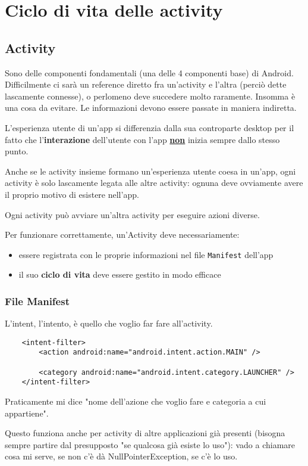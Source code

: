 
\chapter{Ciclo di vita delle activity}
\section{Activity}
\par Sono delle componenti fondamentali (una delle 4 componenti base) di Android. Difficilmente ci sarà un reference diretto fra un'activity e l'altra (perciò dette lascamente connesse), o perlomeno deve succedere molto raramente. Insomma è una cosa da evitare. Le informazioni devono essere passate in maniera indiretta.
\par L'esperienza utente di un'app si differenzia dalla sua controparte desktop per il fatto che l'\textbf{interazione} dell'utente con l'app \textbf{\underline{non}} inizia sempre dallo stesso punto.
\par Anche se le activity insieme formano un'esperienza utente coesa in un'app, ogni activity è solo lascamente legata alle altre activity: ognuna deve ovviamente avere il proprio motivo di esistere nell'app.
\par Ogni activity può avviare un'altra activity per eseguire azioni diverse.
\par Per funzionare correttamente, un'Activity deve necessariamente:
\begin{itemize}
    \item essere registrata con le proprie informazioni nel file \texttt{Manifest} dell'app
    \item il suo \textbf{ciclo di vita} deve essere gestito in modo efficace
\end{itemize}

\subsection{File Manifest}
\par L'intent, l'intento, è quello che voglio far fare all'activity.
\begin{verbatim}
    <intent-filter>
        <action android:name="android.intent.action.MAIN" />

        <category android:name="android.intent.category.LAUNCHER" />
    </intent-filter>
\end{verbatim}
\par Praticamente mi dice "nome dell'azione che voglio fare e categoria a cui appartiene".
\par Questo funziona anche per activity di altre applicazioni già presenti (bisogna sempre partire dal presupposto "se qualcosa già esiste lo uso"): vado a chiamare cosa mi serve, se non c'è dà NullPointerException, se c'è lo uso.

